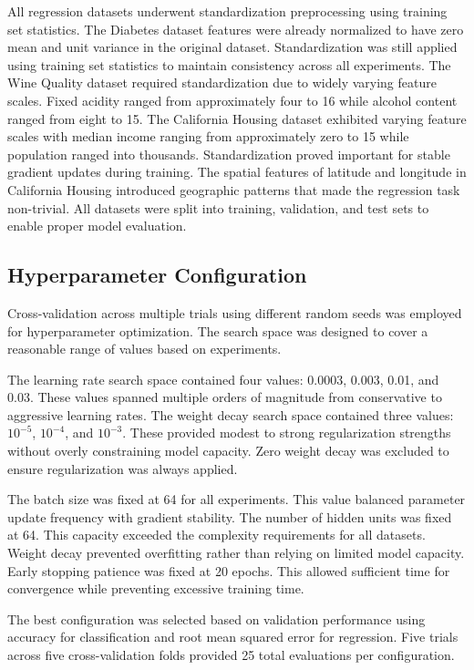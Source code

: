 \documentclass[conference]{IEEEtran}
\begin{document}
All regression datasets underwent standardization preprocessing using training set statistics. The Diabetes dataset features were already normalized to have zero mean and unit variance in the original dataset. Standardization was still applied using training set statistics to maintain consistency across all experiments. The Wine Quality dataset required standardization due to widely varying feature scales. Fixed acidity ranged from approximately four to 16 while alcohol content ranged from eight to 15. The California Housing dataset exhibited varying feature scales with median income ranging from approximately zero to 15 while population ranged into thousands. Standardization proved important for stable gradient updates during training. The spatial features of latitude and longitude in California Housing introduced geographic patterns that made the regression task non-trivial. All datasets were split into training, validation, and test sets to enable proper model evaluation.

\subsection{Hyperparameter Configuration}

Cross-validation across multiple trials using different random seeds was employed for hyperparameter optimization. The search space was designed to cover a reasonable range of values based on experiments.

The learning rate search space contained four values: 0.0003, 0.003, 0.01, and 0.03. These values spanned multiple orders of magnitude from conservative to aggressive learning rates. The weight decay search space contained three values: $10^{-5}$, $10^{-4}$, and $10^{-3}$. These provided modest to strong regularization strengths without overly constraining model capacity. Zero weight decay was excluded to ensure regularization was always applied.

The batch size was fixed at 64 for all experiments. This value balanced parameter update frequency with gradient stability. The number of hidden units was fixed at 64. This capacity exceeded the complexity requirements for all datasets. Weight decay prevented overfitting rather than relying on limited model capacity. Early stopping patience was fixed at 20 epochs. This allowed sufficient time for convergence while preventing excessive training time.

The best configuration was selected based on validation performance using accuracy for classification and root mean squared error for regression. Five trials across five cross-validation folds provided 25 total evaluations per configuration.
\end{document}
